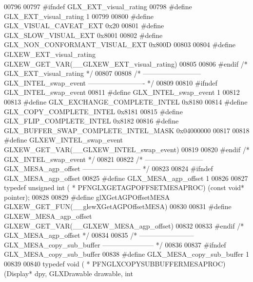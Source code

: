 \begin{DoxyCode}
00796 
00797 \textcolor{preprocessor}{#ifndef GLX\_EXT\_visual\_rating}
00798 \textcolor{preprocessor}{#define GLX\_EXT\_visual\_rating 1}
00799 
00800 \textcolor{preprocessor}{#define GLX\_VISUAL\_CAVEAT\_EXT 0x20}
00801 \textcolor{preprocessor}{#define GLX\_SLOW\_VISUAL\_EXT 0x8001}
00802 \textcolor{preprocessor}{#define GLX\_NON\_CONFORMANT\_VISUAL\_EXT 0x800D}
00803 
00804 \textcolor{preprocessor}{#define GLXEW\_EXT\_visual\_rating GLXEW\_GET\_VAR(\_\_GLXEW\_EXT\_visual\_rating)}
00805 
00806 \textcolor{preprocessor}{#endif }\textcolor{comment}{/* GLX\_EXT\_visual\_rating */}\textcolor{preprocessor}{}
00807 
00808 \textcolor{comment}{/* -------------------------- GLX\_INTEL\_swap\_event ------------------------- */}
00809 
00810 \textcolor{preprocessor}{#ifndef GLX\_INTEL\_swap\_event}
00811 \textcolor{preprocessor}{#define GLX\_INTEL\_swap\_event 1}
00812 
00813 \textcolor{preprocessor}{#define GLX\_EXCHANGE\_COMPLETE\_INTEL 0x8180}
00814 \textcolor{preprocessor}{#define GLX\_COPY\_COMPLETE\_INTEL 0x8181}
00815 \textcolor{preprocessor}{#define GLX\_FLIP\_COMPLETE\_INTEL 0x8182}
00816 \textcolor{preprocessor}{#define GLX\_BUFFER\_SWAP\_COMPLETE\_INTEL\_MASK 0x04000000}
00817 
00818 \textcolor{preprocessor}{#define GLXEW\_INTEL\_swap\_event GLXEW\_GET\_VAR(\_\_GLXEW\_INTEL\_swap\_event)}
00819 
00820 \textcolor{preprocessor}{#endif }\textcolor{comment}{/* GLX\_INTEL\_swap\_event */}\textcolor{preprocessor}{}
00821 
00822 \textcolor{comment}{/* -------------------------- GLX\_MESA\_agp\_offset -------------------------- */}
00823 
00824 \textcolor{preprocessor}{#ifndef GLX\_MESA\_agp\_offset}
00825 \textcolor{preprocessor}{#define GLX\_MESA\_agp\_offset 1}
00826 
00827 \textcolor{keyword}{typedef} \textcolor{keywordtype}{unsigned} int ( * PFNGLXGETAGPOFFSETMESAPROC) (\textcolor{keyword}{const} \textcolor{keywordtype}{void}* pointer);
00828 
00829 \textcolor{preprocessor}{#define glXGetAGPOffsetMESA GLXEW\_GET\_FUN(\_\_glewXGetAGPOffsetMESA)}
00830 
00831 \textcolor{preprocessor}{#define GLXEW\_MESA\_agp\_offset GLXEW\_GET\_VAR(\_\_GLXEW\_MESA\_agp\_offset)}
00832 
00833 \textcolor{preprocessor}{#endif }\textcolor{comment}{/* GLX\_MESA\_agp\_offset */}\textcolor{preprocessor}{}
00834 
00835 \textcolor{comment}{/* ------------------------ GLX\_MESA\_copy\_sub\_buffer ----------------------- */}
00836 
00837 \textcolor{preprocessor}{#ifndef GLX\_MESA\_copy\_sub\_buffer}
00838 \textcolor{preprocessor}{#define GLX\_MESA\_copy\_sub\_buffer 1}
00839 
00840 \textcolor{keyword}{typedef} void ( * PFNGLXCOPYSUBBUFFERMESAPROC) (Display* dpy, GLXDrawable drawable, \textcolor{keywordtype}{int} 

\end{DoxyCode}
